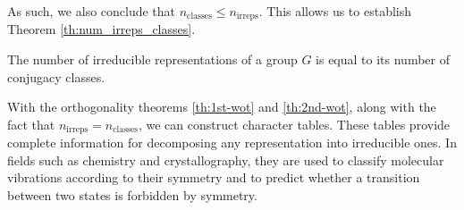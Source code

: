 As such, we also conclude that $n_{\text{classes}} \leq n_{\text{irreps}}$. This allows us to establish Theorem \ref{th:num_irreps_classes}.

\begin{theorem}[$\bm{n_{\textbf{irreps}} = n_{\textbf{classes}}}$] \label{th:num_irreps_classes}
The number of irreducible representations of a group $G$ is equal to its number of conjugacy classes.
\end{theorem}

With the orthogonality theorems \ref{th:1st-wot} and \ref{th:2nd-wot}, along with the fact that \(n_{\text{irreps}} = n_{\text{classes}}\), we can construct character tables. These tables provide complete information for decomposing any representation into irreducible ones. In fields such as chemistry and crystallography, they are used to classify molecular vibrations according to their symmetry and to predict whether a transition between two states is forbidden by symmetry.

